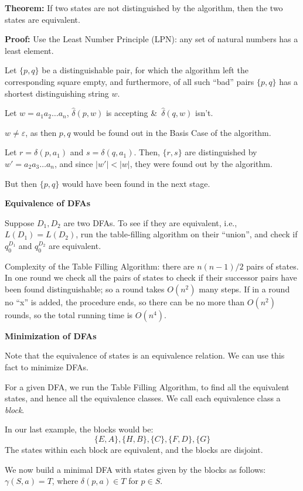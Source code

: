 \begin{frame}

{\bf Theorem:} If two states are not distinguished by the algorithm, then
the two states are equivalent.

{\bf Proof:} Use the Least Number Principle (LPN): any set of natural
numbers has a least element.

Let $\{p,q\}$ be a distinguishable pair, for which the algorithm left
the corresponding square empty, and furthermore, of all such ``bad''
pairs $\{p,q\}$ has a shortest distinguishing string $w$.

Let $w=a_1a_2\ldots a_n$,
$\hat\delta(p,w)$ is accepting \&\ $\hat\delta(q,w)$ isn't.

$w\neq\varepsilon$, as then $p,q$ would be found out in the Basis Case
of the algorithm.

Let $r=\delta(p,a_1)$ and $s=\delta(q,a_1)$.  Then, $\{r,s\}$ are
distinguished by $w'=a_2a_3\ldots a_n$, and since $|w'|<|w|$, they
were found out by the algorithm.

But then $\{p,q\}$ would have been found in the next stage.
\end{frame}

\begin{frame}

{\bf Equivalence of DFAs}

Suppose $D_1,D_2$ are two DFAs.  To see if they are equivalent, i.e.,
$L(D_1)=L(D_2)$, run the table-filling algorithm on their ``union'',
and check if $q^{D_1}_0$ and $q^{D_2}_0$ are equivalent.

Complexity of the Table Filling Algorithm: there are
$n(n-1)/2$ pairs of states.  In one round we check all the pairs of
states to check if their successor pairs have been found
distinguishable; so a round takes $O(n^2)$ many steps.  If in a round
no ``x'' is added, the procedure ends, so there can be no more than
$O(n^2)$ rounds, so the total running time is $O(n^4)$.
\end{frame}

\begin{frame}

{\bf Minimization of DFAs}

Note that the equivalence of states is an equivalence relation.  We
can use this fact to minimize DFAs.

For a given DFA, we run the Table Filling Algorithm, to find all the
equivalent states, and hence all the equivalence classes.  We call
each equivalence class a {\em block}.

In our last example, the blocks would be:
$$
\{E,A\},\{H,B\},\{C\},\{F,D\},\{G\}
$$
The states within each block are equivalent, and the blocks are
disjoint.

We now build a minimal DFA with states given by the blocks as follows:
$\gamma(S,a)=T$, where $\delta(p,a)\in T$ for $p\in S$.
\end{frame}

